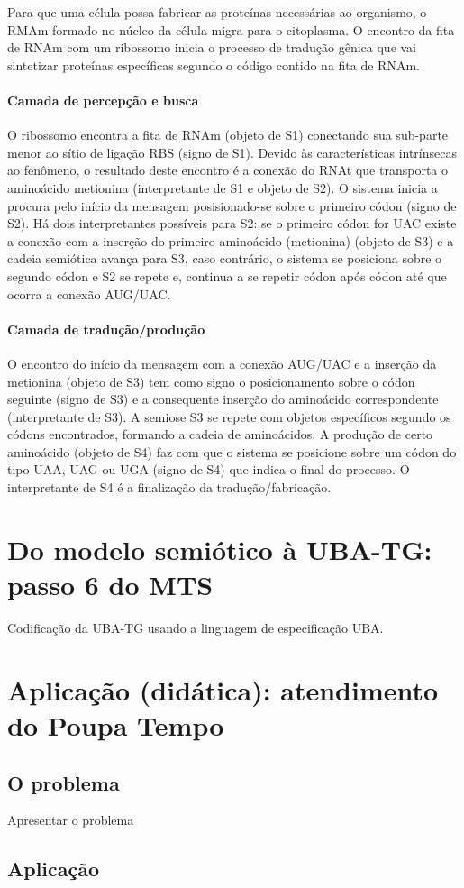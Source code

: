 Para que uma célula possa fabricar as proteínas necessárias ao organismo, o RMAm formado no núcleo da célula migra para o citoplasma. O encontro da fita de RNAm com um ribossomo inicia o processo de tradução gênica que vai sintetizar proteínas específicas segundo o código contido na fita de RNAm.

\paragraph*{Camada de percepção e busca}

O ribossomo encontra a fita de RNAm (objeto de S1) conectando sua sub-parte menor ao sítio de ligação RBS (signo de S1). Devido às características intrínsecas ao fenômeno, o resultado deste encontro é a conexão do RNAt que transporta o aminoácido metionina (interpretante de S1 e objeto de S2). O sistema inicia a procura pelo início da mensagem posisionado-se sobre o primeiro códon (signo de S2). Há dois interpretantes possíveis para S2: se o primeiro códon for UAC existe a conexão com a inserção do primeiro aminoácido (metionina) (objeto de S3) e a cadeia semiótica avança para S3, caso contrário, o sistema se posiciona sobre o segundo códon e S2 se repete e, continua a se repetir códon após códon até que ocorra a conexão AUG/UAC.

\paragraph*{Camada de tradução/produção}

O encontro do início da mensagem com a conexão AUG/UAC e a inserção da metionina (objeto de S3) tem como signo o posicionamento sobre o códon seguinte (signo de S3) e a consequente inserção do aminoácido correspondente (interpretante de S3). A semiose S3 se repete com objetos específicos segundo os códons encontrados, formando a cadeia de aminoácidos. A produção de certo aminoácido (objeto de S4) faz com que o sistema se posicione sobre um códon do tipo UAA, UAG ou UGA (signo de S4) que indica o final do processo. O interpretante de S4 é a finalização da tradução/fabricação.


\section{Do modelo semiótico à UBA-TG: passo 6 do MTS}

Codificação da UBA-TG usando a linguagem de especificação UBA.

\section{Aplicação (didática): atendimento do Poupa Tempo }

\subsection{O problema}

Apresentar o problema

\subsection{Aplicação}
